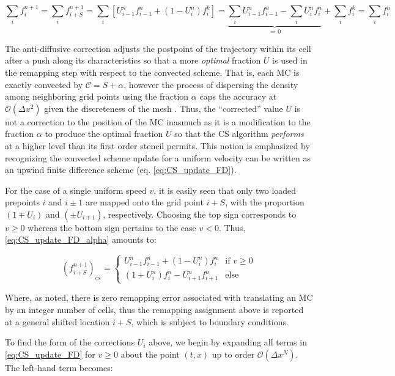 \documentclass[11pt,titlepage]{report}
\begin{document}
$$\sum_i f_i^{n+1} = \sum_i f_{i+S}^{n+1} = \sum_i [U_{i-1}^n f_{i-1}^n + (1 - U_i^n) f_i^k] = \underbrace{\sum_i U_{i-1}^n f_{i-1}^n - \sum_i U_i^n f_i^n}_{=\,0} + \sum_i f_i^k = \sum_i f^n_i$$

The anti-diffusive correction adjusts the postpoint of the trajectory within its cell after a push along its characteristics so that a more \emph{optimal} fraction $U$ is used in the remapping step with respect to the convected scheme. That is, each MC is exactly convected by $\mathcal{C} = S + \alpha$, however the process of dispersing the density among neighboring grid points using the fraction $\alpha$ caps the accuracy at $\mathcal{O}(\Delta x^2)$ given the discreteness of the mesh \cite{Besse08}. Thus, the ``corrected'' value $U$ is not a correction to the position of the MC inasmuch as it is a modification to the fraction $\alpha$ to produce the optimal fraction $U$ so that the CS algorithm \emph{performs} at a higher level than its first order stencil permits. This notion is emphasized by recognizing the convected scheme update for a uniform velocity can be written as an upwind finite difference scheme (eq. \eqref{eq:CS_update_FD}).

For the case of a single uniform speed $v$, it is easily seen that only two loaded prepoints $i$ and $i\pm 1$ are mapped onto the grid point $i+S$, with the proportion $(1 \mp U_{i})$ and $(\pm U_{i\mp 1})$, respectively. Choosing the top sign corresponds to $v \geq 0$ whereas the bottom sign pertains to the case $v < 0$. Thus, \eqref{eq:CS_update_FD_alpha} amounts to:

\begin{equation}
\label{eq:CS_update_FD}
 (f_{i+S}^{n+1})_{_{\mathrm{CS}}} =
  \begin{cases}
   U_{i-1}^{n} f_{i-1}^n + (1 - U_i^n)f_i^n & \text{if } v \geq 0 \\[0.75em]
   (1 + U_i^n)f_i^n - U_{i+1}^n f_{i+1}^n & \text{else }
  \end{cases}
\end{equation}

\noindent Where, as noted, there is zero remapping error associated with translating an MC by an integer number of cells, thus the remapping assignment above is reported at a general shifted location $i + S$, which is subject to boundary conditions.

To find the form of the corrections $U_i$ above, we begin by expanding all terms in \eqref{eq:CS_update_FD} for $v \geq 0$ about the point $(t,x)$ up to order $\mathcal{O}(\Delta x^N)$. The left-hand term becomes:
\end{document}
